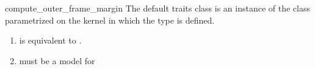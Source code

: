 \begin{ccRefFunction}{compute_outer_frame_margin}
The default traits class  is an instance of the
class  parametrized on
the kernel in which the type  is defined.

\begin{enumerate}
   \item    {}
            is equivalent to .
   \item    {} must be a model for 
\end{enumerate}

\ccSeeAlso
{}\\
\\

\end{ccRefFunction}



